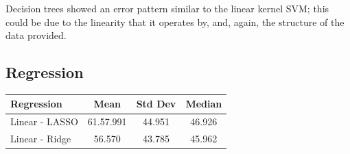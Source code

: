 \documentclass{article}
\begin{document}
Decision trees showed an error pattern similar to the linear kernel SVM; this could be due to the linearity that it operates by, and, again, the structure of the data provided. 

\subsection{Regression}

\begin{center}
\begin{tabular}{l|c|c|c}
Regression & Mean & Std Dev & Median\\
\hline
Linear - LASSO & 61.57.991 & 44.951 & 46.926 \\
Linear - Ridge & 56.570 & 43.785 & 45.962
\end{tabular}
\end{center}
\end{document}
